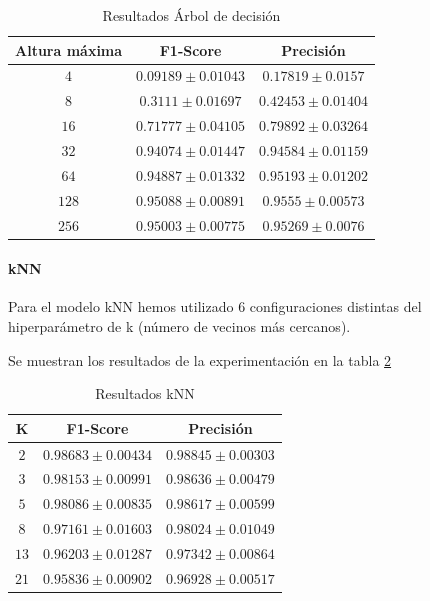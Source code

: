 \documentclass[12pt]{article}
\begin{document}
\begin{table}[!ht]
	\caption{Resultados Árbol de decisión}
	\centering
		 \begin{tabular}{||c c c||}
			 \hline
			 Altura máxima & F1-Score & Precisión  \\ [0.5ex]
			 \hline\hline
			 $4$ & $0.09189 \pm 0.01043$ & $0.17819 \pm 0.0157$ \\
			\hline
			$8$ & $0.3111 \pm 0.01697$ & $0.42453 \pm 0.01404$ \\
			\hline
			$16$ & $0.71777 \pm 0.04105$ & $0.79892 \pm 0.03264$ \\
			\hline
			$32$ & $0.94074 \pm 0.01447$ & $0.94584 \pm 0.01159$ \\
			\hline
			$64$ & $0.94887 \pm 0.01332$ & $0.95193 \pm 0.01202$ \\
			\hline
			$128$ & $0.95088 \pm 0.00891$ & $0.9555 \pm 0.00573$ \\
			\hline
			$256$ & $0.95003 \pm 0.00775$ & $0.95269 \pm 0.0076$ \\
			\hline
		 \end{tabular}
	\label{Tab:DecisionTree_3}
	\end{table}

\paragraph{kNN}
Para el modelo kNN hemos utilizado 6 configuraciones distintas del hiperparámetro de k (número de vecinos más cercanos).

Se muestran los resultados de la experimentación en la tabla \ref{Tab:kNN_3}

\begin{table}[!ht]
	\caption{Resultados kNN}
	\centering
		 \begin{tabular}{||c c c||}
			 \hline
			 K & F1-Score & Precisión  \\ [0.5ex]
			 \hline\hline
			 $2$ & $0.98683 \pm 0.00434$ & $0.98845 \pm 0.00303$ \\
			\hline
			$3$ & $0.98153 \pm 0.00991$ & $0.98636 \pm 0.00479$ \\
			\hline
			$5$ & $0.98086 \pm 0.00835$ & $0.98617 \pm 0.00599$ \\
			\hline
			$8$ & $0.97161 \pm 0.01603$ & $0.98024 \pm 0.01049$ \\
			\hline
			$13$ & $0.96203 \pm 0.01287$ & $0.97342 \pm 0.00864$ \\
			\hline
			$21$ & $0.95836 \pm 0.00902$ & $0.96928 \pm 0.00517$ \\
			\hline
		 \end{tabular}
	\label{Tab:kNN_3}
\end{table}
\end{document}
